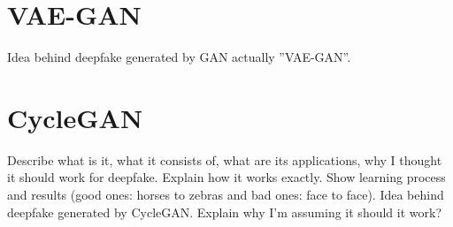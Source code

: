 \section{VAE-GAN}
Idea behind deepfake generated by GAN actually ''VAE-GAN''.

\section{CycleGAN}
Describe what is it, what it consists of, what are its applications, why I thought it should work for deepfake. Explain how it works exactly. Show learning process and results (good ones: horses to zebras and bad ones: face to face). Idea behind deepfake generated by CycleGAN. Explain why I'm assuming it should it work?
